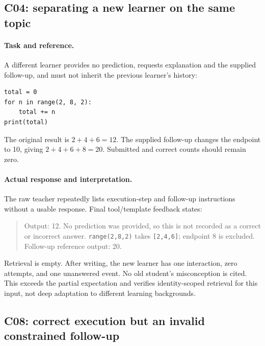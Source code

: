 \subsection{C04: separating a new learner on the same topic}
\paragraph{Task and reference.}
A different learner provides no prediction, requests explanation and the supplied follow-up, and must not inherit the previous learner's history:
\begin{verbatim}
total = 0
for n in range(2, 8, 2):
    total += n
print(total)
\end{verbatim}
The original result is $2+4+6=12$. The supplied follow-up changes the endpoint to 10, giving $2+4+6+8=20$. Submitted and correct counts should remain zero.

\paragraph{Actual response and interpretation.}
The raw teacher repeatedly lists execution-step and follow-up instructions without a usable response. Final tool/template feedback states:
\begin{quote}\small
Output: 12. No prediction was provided, so this is not recorded as a correct or incorrect answer. \texttt{range(2,8,2)} takes \texttt{[2,4,6]}; endpoint 8 is excluded. Follow-up reference output: 20.
\end{quote}
Retrieval is empty. After writing, the new learner has one interaction, zero attempts, and one unanswered event. No old student's misconception is cited. This exceeds the partial expectation and verifies identity-scoped retrieval for this input, not deep adaptation to different learning backgrounds.

\subsection{C08: correct execution but an invalid constrained follow-up}
